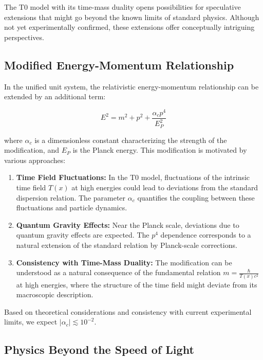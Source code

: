 \documentclass[12pt,a4paper]{article}
\newcommand{\Tfield}{T(x)}
\begin{document}
	The T0 model with its time-mass duality opens possibilities for speculative extensions that might go beyond the known limits of standard physics. Although not yet experimentally confirmed, these extensions offer conceptually intriguing perspectives.
	
	\subsection{Modified Energy-Momentum Relationship}
	\label{subsec:modified_energy_momentum}
	
	In the unified unit system, the relativistic energy-momentum relationship can be extended by an additional term:
	
	\begin{equation}
		\label{eq:modified_energy_momentum}
		E^2 = m^2 + p^2 + \frac{\alpha_c p^4}{E_P^2}
	\end{equation}
	
	where \(\alpha_c\) is a dimensionless constant characterizing the strength of the modification, and \(E_P\) is the Planck energy. This modification is motivated by various approaches:
	
	\begin{enumerate}
		\item \textbf{Time Field Fluctuations:} In the T0 model, fluctuations of the intrinsic time field \(\Tfield\) at high energies could lead to deviations from the standard dispersion relation. The parameter \(\alpha_c\) quantifies the coupling between these fluctuations and particle dynamics.
		\item \textbf{Quantum Gravity Effects:} Near the Planck scale, deviations due to quantum gravity effects are expected. The \(p^4\) dependence corresponds to a natural extension of the standard relation by Planck-scale corrections.
		\item \textbf{Consistency with Time-Mass Duality:} The modification can be understood as a natural consequence of the fundamental relation \(m = \frac{\hbar}{\Tfield c^2}\) at high energies, where the structure of the time field might deviate from its macroscopic description.
	\end{enumerate}
	
	Based on theoretical considerations and consistency with current experimental limits, we expect \(|\alpha_c| \lesssim 10^{-2}\).
	
	\subsection{Physics Beyond the Speed of Light}
	\label{subsec:beyond_c}
	
\end{document}
